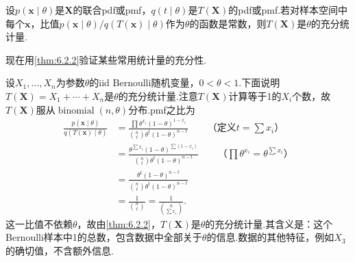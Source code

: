 \begin{theorem}\label{thm:6.2.2}
设$p(\boldsymbol x\mid\theta)$是$\boldsymbol X$的联合pdf或pmf，$q(t\mid\theta)$是$T(\boldsymbol X)$的pdf或pmf.若对样本空间中每个$\boldsymbol x$，比值$p(\boldsymbol x\mid\theta)/q(T(\boldsymbol x)\mid\theta)$作为$\theta$的函数是常数，则$T(\boldsymbol X)$是$\theta$的充分统计量.
\end{theorem}
现在用\autoref{thm:6.2.2}验证某些常用统计量的充分性.
\begin{example}[二项分布的充分统计量]\label{ex:6.2.3}
设$X_1,\ldots,X_n$为参数$\theta$的iid Bernoulli随机变量，$0<\theta<1$.下面说明$T(\boldsymbol X)=X_1+\cdots+X_n$是$\theta$的充分统计量.注意$T(\boldsymbol X)$计算等于1的$X_i$个数，故$T(\boldsymbol X)$服从$\operatorname{binomial}(n,\theta)$分布.pmf之比为
\begin{align*}
\frac{p(\boldsymbol x\mid\theta)}{q(T(\boldsymbol x)\mid\theta)}
&=\frac{\prod\theta^{x_i}(1-\theta)^{1-x_i}}{\binom nt\theta^t(1-\theta)^{n-t}}\qquad\text{（定义$t=\sum x_i$）}\\
&=\frac{\theta^{\sum x_i}(1-\theta)^{\sum(1-x_i)}}{\binom nt\theta^t(1-\theta)^{n-t}}\qquad\text{（$\prod\theta^{x_i}=\theta^{\sum x_i}$）}\\
&=\frac{\theta^t(1-\theta)^{n-t}}{\binom nt\theta^t(1-\theta)^{n-t}}\\
&=\frac1{\binom nt}=\frac1{\binom n{\sum x_i}}.
\end{align*}
这一比值不依赖$\theta$，故由\autoref{thm:6.2.2}，$T(\boldsymbol X)$是$\theta$的充分统计量.其含义是：这个Bernoulli样本中1的总数，包含数据中全部关于$\theta$的信息.数据的其他特征，例如$X_3$的确切值，不含额外信息.
\end{example}
